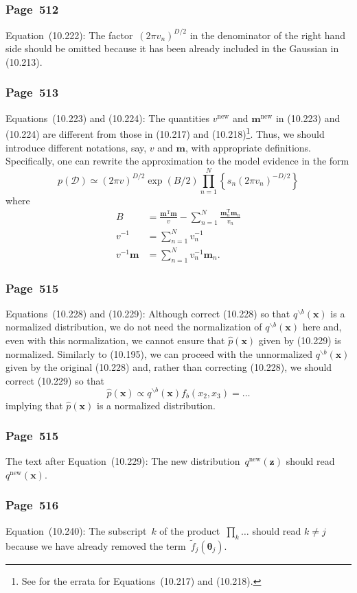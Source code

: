 \documentclass[12pt,a4paper]{article}
\newcommand{\erratum}[1]{\subsubsection*{#1}}
\begin{document}
\erratum{Page~512}
Equation~(10.222):
The factor~$\left( 2 \pi v_n \right)^{D/2}$ in the denominator of the right hand side should be
omitted because it has been already included in the Gaussian in (10.213).

\erratum{Page~513}
Equations~(10.223) and (10.224):
The quantities $v^{\text{new}}$ and $\mathbf{m}^{\text{new}}$ in (10.223) and (10.224) are
different from those in (10.217) and (10.218)\footnote{See \citet{Svensen:PRML_errata}
for the errata for Equations~(10.217) and (10.218).}.
Thus, we should introduce different notations, say, $v$ and $\mathbf{m}$, with appropriate
definitions.
Specifically, one can rewrite the approximation to the model evidence in the form
\begin{equation}
p(\mathcal{D}) \simeq \left( 2\pi v \right)^{D/2} \exp\left( B/2 \right)
  \prod_{n=1}^{N} \left\{ s_n \left( 2\pi v_n \right)^{-D/2} \right\}
\end{equation}
where
\begin{align}
B &= \frac{\mathbf{m}^{\operatorname{T}}\mathbf{m}}{v}
  - \sum_{n=1}^{N} \frac{\mathbf{m}_n^{\operatorname{T}}\mathbf{m}_n}{v_n} \\
v^{-1} &= \sum_{n=1}^{N} v_n^{-1} \\
v^{-1} \mathbf{m} &= \sum_{n=1}^{N} v_n^{-1} \mathbf{m}_n .
\end{align}

\erratum{Page~515}
Equations~(10.228) and (10.229):
Although \citet{Svensen:PRML_errata} correct (10.228) so that $q^{\backslash b}(\mathbf{x})$ is
a normalized distribution,
we do not need the normalization of $q^{\backslash b}(\mathbf{x})$ here and,
even with this normalization, we cannot ensure that $\hat{p}(\mathbf{x})$ given by (10.229)
is normalized.
Similarly to (10.195), we can proceed with the unnormalized $q^{\backslash b}(\mathbf{x})$ given by
the original (10.228) and, rather than correcting (10.228), we should correct (10.229) so that
\begin{equation}
\hat{p}(\mathbf{x}) \propto q^{\backslash b}(\mathbf{x}) f_b(x_2, x_3) = \dots
\end{equation}
implying that $\hat{p}(\mathbf{x})$ is a normalized distribution.

\erratum{Page~515}
The text after Equation~(10.229):
The new distribution~$q^{\text{new}}(\mathbf{z})$ should read $q^{\text{new}}(\mathbf{x})$.

\erratum{Page~516}
Equation~(10.240):
The subscript~$k$ of the product~$\displaystyle\prod_{k} \dots$ should read $k \neq j$
because we have already removed the term~$\tilde{f}_j(\bm{\theta}_j)$.
\end{document}
